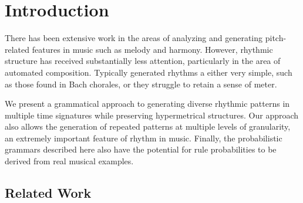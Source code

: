 \documentclass{article}
\title{\papertitle}
\begin{document}
%
\capstartfalse
\maketitle
\capstarttrue
%
\begin{abstract}

[Will need to be tweaked at the end to reflect any additions, but the original intro seems like a good fit here at the moment]

We present an approach for generating passages of rhythm via the use of a probabilistic temporal graph grammar with rule sets that operate via recursive subdivision. This project is motivated by three factors: (1) the recognition that the literature on computer-generated rhythm is generally not as robust as those for melody and harmony; (2) my desire as a composer of avant-garde classical music to have more tools for computer-assisted composition; and (3) the hope that such an approach, having already produced compelling results for some styles of music, may provide insight into the structure of rhythms found in existing repertoires.
\end{abstract}


\section{Introduction}\label{sec:introduction}

There has been extensive work in the areas of analyzing and generating pitch-related features in music such as melody and harmony. However, rhythmic structure has received substantially less attention, particularly in the area of automated composition. Typically generated rhythms a either very simple, such as those found in Bach chorales, or they struggle to retain a sense of meter. 

We present a grammatical approach to generating diverse rhythmic patterns in multiple time signatures while preserving hypermetrical structures. Our approach also allows the generation of repeated patterns at multiple levels of granularity, an extremely important feature of rhythm in music. Finally, the probabilistic grammars described here also have the potential for rule probabilities to be derived from real musical examples.

\subsection{Related Work}
\end{document}
